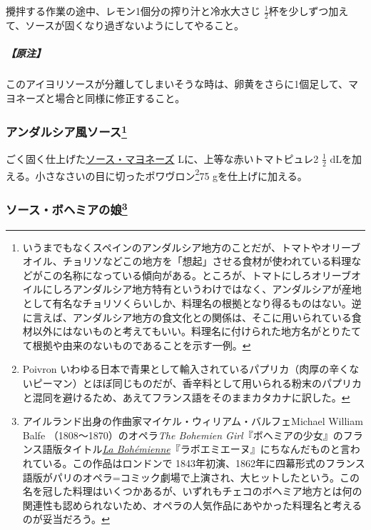 \begin{recette}
攪拌する作業の途中、レモン1個分の搾り汁と冷水大さじ
\(\frac{1}{2}\)杯を少しずつ加えて、ソースが固くなり過ぎないようにしてやること。

\hypertarget{nota-sauce-aioli}{%
\subparagraph{【原注】}\label{nota-sauce-aioli}}

このアイヨリソースが分離してしまいそうな時は、卵黄をさらに1個足して、マヨネーズと場合と同様に修正すること。

\hypertarget{sauce-andalouse}{%
\subsubsection[アンダルシア風ソース]{\texorpdfstring{アンダルシア風ソース\footnote{いうまでもなくスペインのアンダルシア地方のことだが、トマトやオリーブオイル、チョリソなどこの地方を「想起」させる食材が使われている料理などがこの名称になっている傾向がある。ところが、トマトにしろオリーブオイルにしろアンダルシア地方特有というわけではなく、アンダルシアが産地として有名なチョリソくらいしか、料理名の根拠となり得るものはない。逆に言えば、アンダルシア地方の食文化との関係は、そこに用いられている食材以外にはないものと考えてもいい。料理名に付けられた地方名がとりたてて根拠や由来のないものであることを示す一例。}}{アンダルシア風ソース}}\label{sauce-andalouse}}



ごく固く仕上げた\protect\hyperlink{mayonnaise}{ソース・マヨネーズ}\troisquarts{}
Lに、上等な赤いトマトピュレ2 \(\frac{1}{2}\)
dLを加える。小さなさいの目に切ったポワヴロン\footnote{Poivron
  いわゆる日本で青果として輸入されているパプリカ（肉厚の辛くないピーマン）とほぼ同じものだが、香辛料として用いられる粉末のパプリカと混同を避けるため、あえてフランス語をそのままカタカナに訳した。}75
gを仕上げに加える。

\hypertarget{sauce-bohemienne}{%
\subsubsection[ソース・ボヘミアの娘]{\texorpdfstring{ソース・ボヘミアの娘\footnote{アイルランド出身の作曲家マイケル・ウィリアム・バルフェMichael
  William Balfe （1808〜1870）のオペラ\emph{The Bohemien
  Girl}『ボヘミアの少女』のフランス語版タイトル\href{https://archive.org/details/labohmiennegrand00balf}{\emph{La
  Bohémienne}}『ラボエミエーヌ』にちなんだものと言われている。この作品はロンドンで
  1843年初演、1862年に四幕形式のフランス語版がパリのオペラ=コミック劇場で上演され、大ヒットしたという。この名を冠した料理はいくつかあるが、いずれもチェコのボヘミア地方とは何の関連性も認められないため、オペラの人気作品にあやかった料理名と考えるのが妥当だろう。}}{ソース・ボヘミアの娘}}\label{sauce-bohemienne}}


\end{recette}
